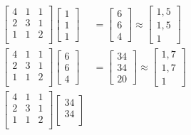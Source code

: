 \documentclass{article}
\begin{document}
\begin{align}
    \begin{bmatrix}
        4 & 1 & 1\\
        2 & 3 & 1\\
        1 & 1 & 2\\
    \end{bmatrix}
    \begin{bmatrix}
        1\\
        1\\
        1
    \end{bmatrix}
    &=
    \begin{bmatrix}
        6\\
        6\\
        4
    \end{bmatrix}
    \approx
    \begin{bmatrix}
        1,5\\
        1,5\\
        1
    \end{bmatrix}\\
        \begin{bmatrix}
        4 & 1 & 1\\
        2 & 3 & 1\\
        1 & 1 & 2\\
    \end{bmatrix}
    \begin{bmatrix}
        6\\
        6\\
        4
    \end{bmatrix}
    &=
    \begin{bmatrix}
        34\\
        34\\
        20
    \end{bmatrix}
    \approx
    \begin{bmatrix}
        1,7\\
        1,7\\
        1
    \end{bmatrix}\\
        \begin{bmatrix}
        4 & 1 & 1\\
        2 & 3 & 1\\
        1 & 1 & 2\\
    \end{bmatrix}
    \begin{bmatrix}
        34\\
        34\\

\end{bmatrix}
\end{align}
\end{document}
